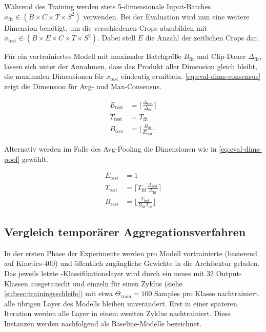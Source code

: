 Während des Training werden stets 5-dimensionale Input-Batches $x_\text{fit} \in (B \times C \times T \times S^2)$ verwenden.
Bei der Evaluation wird nun eine weitere Dimension benötigt, um die verschiedenen Crops abzubilden mit $x_\text{test} \in (B \times E \times C \times T \times S^2)$.
Dabei stell $E$ die Anzahl der zeitlichen Crops dar.

Für ein vortrainiertes Modell mit maximaler Batchgröße $B_\text{fit}$ und Clip-Dauer $\Delta_\text{fit}$, lassen sich unter der Annahmen, dass das Produkt aller Dimension gleich bleibt, die maximalen Dimensionen für $x_\text{test}$ eindeutig ermitteln.
\autoref{eq:eval-dims-consensus} zeigt die Dimension für Avg- und Max-Consensus.

\begin{equation}
    \label{eq:eval-dims-consensus}
    \begin{split}
    E_\text{test}           & = \lceil  \frac{\Delta_\text{test}}{\Delta_\text{fit}}  \rceil \\
    T_\text{test}           & = T_{\text{fit}} \\
    B_\text{test}           & = \lfloor \frac{B_\text{fit}}{E_\text{test}} \rfloor
    \end{split}
\end{equation}

Alternativ werden im Falle des Avg-Pooling die Dimensionen wie in \autoref{eq:eval-dims-pool} gewählt.

\begin{equation}
    \label{eq:eval-dims-pool}
    \begin{split}
    E_\text{test}           & = 1 \\
    T_\text{test}           & = \lceil T_\text{fit} \frac{\Delta_\text{test}}{\Delta_\text{fit}} \rceil \\
    B_\text{test}           & = \lfloor \frac{T_\text{test} }{B_\text{fit} T_\text{fit}} \rfloor
    \end{split}
\end{equation}

\subsection{Vergleich temporärer Aggregationsverfahren}
\label{subsec:initialisierungsphase}

In der ersten Phase der Experimente werden pro Modell vortrainierte (basierend auf Kinetics-400) und öffentlich zugängliche Gewichte in die Architektur geladen.
Das jeweils letzte \fc-Klassifikationslayer wird durch ein neues mit 32 Output-Klassen ausgetauscht und einzeln für einen Zyklus (siehe \autoref{subsec:trainingsschleife}) mit etwa $\Theta_\text{train} = 100$ Samples pro Klasse nachtrainiert.
\Dh alle übrigen Layer des Modells bleiben unverändert.
Erst in einer späteren Iteration werden alle Layer in einem zweiten Zyklus nachtrainiert.
Diese Instanzen werden nachfolgend als Baseline-Modelle bezeichnet.

